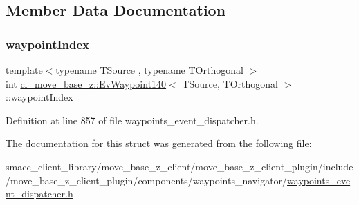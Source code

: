 \subsection{Member Data Documentation}
\mbox{\label{structcl__move__base__z_1_1EvWaypoint140_a4a579969b1d0569cbc4e31986c1e674f}} 
\subsubsection{\texorpdfstring{waypoint\+Index}{waypointIndex}}
{\footnotesize\ttfamily template$<$typename T\+Source , typename T\+Orthogonal $>$ \\
int \hyperlink{structcl__move__base__z_1_1EvWaypoint140}{cl\+\_\+move\+\_\+base\+\_\+z\+::\+Ev\+Waypoint140}$<$ T\+Source, T\+Orthogonal $>$\+::waypoint\+Index}



Definition at line 857 of file waypoints\+\_\+event\+\_\+dispatcher.\+h.



The documentation for this struct was generated from the following file\+:\begin{DoxyCompactItemize}
\item 
smacc\+\_\+client\+\_\+library/move\+\_\+base\+\_\+z\+\_\+client/move\+\_\+base\+\_\+z\+\_\+client\+\_\+plugin/include/move\+\_\+base\+\_\+z\+\_\+client\+\_\+plugin/components/waypoints\+\_\+navigator/\hyperlink{waypoints__event__dispatcher_8h}{waypoints\+\_\+event\+\_\+dispatcher.\+h}\end{DoxyCompactItemize}
